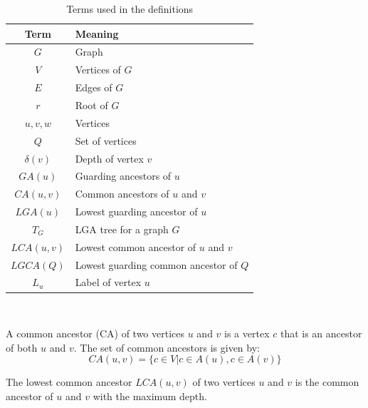 \begin{table}[ht]
    \centering
	\captionsetup{justification=centering}
	\begin{tabular}{c l}
		\textbf{Term} & \textbf{Meaning} \\
		\hline 
		$G$ & Graph \\
		$V$ & Vertices of $G$\\
		$E$ & Edges of $G$\\
		$r$ & Root of $G$\\
		$u, v, w$& Vertices \\
		$Q$ & Set of vertices\\
		$\delta(v)$ & Depth of vertex $v$\\
		$GA(u)$ & Guarding ancestors of $u$\\
		$CA(u,v)$ & Common ancestors of $u$ and $v$\\
		$LGA(u)$ & Lowest guarding ancestor of $u$\\
		$T_G$ & LGA tree for a graph $G$\\
		$LCA(u,v)$ & Lowest common ancestor of $u$ and $v$\\
		$LGCA(Q)$ & Lowest guarding common ancestor of $Q$\\
		$L_u$ & Label of vertex $u$\\
	\end{tabular}\\
	\caption{Terms used in the definitions}
	\label{definitionsLegend}
\end{table}



\begin{definition} \label{def:commonAncestor}
	A common ancestor (CA) of two vertices $u$ and $v$ is a vertex $c$ that is an ancestor of both $u$ and $v$.
	The set of common ancestors is given by:
	\begin{equation*}
		\mathit{CA}(u,v) =	\{c \in V | c \in A(u) , c \in A(v)\}
	\end{equation*}
\end{definition}

\begin{definition} \label{def:LowestCommonAncestor}
	The lowest common ancestor $LCA(u,v)$ of two vertices $u$ and $v$ is the common ancestor of $u$ and $v$ with the maximum depth.
\end{definition}


